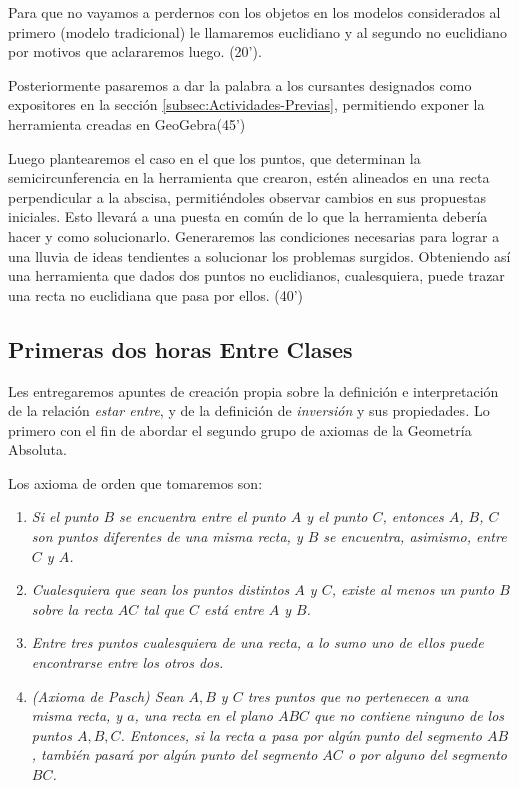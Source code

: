 \documentclass[oneside,spanish]{amsart}
\numberwithin{equation}{section}
\numberwithin{figure}{section}
\theoremstyle{definition}
\begin{document}
Para que no vayamos a perdernos con los objetos en los modelos considerados al primero (modelo tradicional) le llamaremos euclidiano y al segundo no euclidiano por motivos que aclararemos luego. (20').

Posteriormente pasaremos a dar la palabra a los cursantes designados como expositores en la sección \ref{subsec:Actividades-Previas}, permitiendo exponer la herramienta creadas en GeoGebra(45')

Luego plantearemos el caso en el que los puntos, que determinan la semicircunferencia en la herramienta que crearon, estén alineados en una recta perpendicular a la abscisa, permitiéndoles observar cambios en sus propuestas iniciales. Esto llevará a una puesta en común de lo que la herramienta debería hacer y como solucionarlo. Generaremos las condiciones necesarias para lograr a una lluvia de ideas tendientes a solucionar los problemas surgidos. Obteniendo así una herramienta que dados dos puntos no euclidianos, cualesquiera, puede trazar una recta no euclidiana que pasa por ellos. (40')

\subsection{Primeras dos horas Entre Clases\label{subsec:Primeras-dos-EC}}

Les entregaremos apuntes de creación propia sobre la definición e interpretación de la relación \emph{estar entre}, y de la definición de \emph{inversión} y sus propiedades\emph{.} Lo primero con el fin de abordar el segundo grupo de axiomas de la Geometría Absoluta.

Los axioma de orden que tomaremos son:
\begin{enumerate}[label=Ax II.\arabic{enumi}]
	\item \emph{Si el punto $B$ se encuentra entre el punto $A$ y el punto $C$, entonces $A$, $B$, $C$ son puntos diferentes de una misma recta, y $B$ se encuentra, asimismo, entre $C$ y $A$.}
	\item \emph{Cualesquiera que sean los puntos distintos $A$ y $C$, existe al menos un punto $B$ sobre la recta $AC$ tal que $C$ está entre $A$ y $B$.}
	\item \emph{Entre tres puntos cualesquiera de una recta, a lo sumo uno de ellos puede encontrarse entre los otros dos.}
	\item \emph{(Axioma de Pasch) Sean $A,$$B$ y $C$ tres puntos que no pertenecen a una misma recta, y $a$, una recta en el plano $ABC$ que no contiene ninguno de los puntos $A,B,C$. Entonces, si la recta $a$ pasa por algún punto del segmento $AB$, también pasará por algún punto del segmento $AC$ o por alguno del segmento $BC$.}
\end{enumerate}
\end{document}

